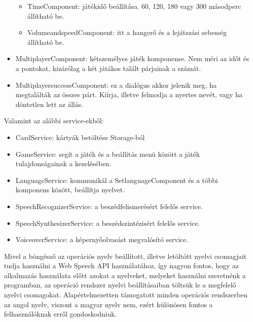 \documentclass[12pt]{report}
\begin{document}
\begin{itemize}
\begin{itemize}
        \item TimeComponent: játékidő beállítása. 60, 120, 180 vagy 300 másodperc állítható be.
        \item VolumeandspeedComponent: itt a hangerő és a lejátszási sebesség állítható be.
    \end{itemize}
    \item MultiplayerComponent: kétszemélyes játék komponense. Nem méri az időt és a pontokat, kizárólag a két játákos talált párjainak a számát.
    \item MultiplayersuccessComponent: ez a dialógus akkor jelenik meg, ha megtalálták az összes párt. Kiírja, illetve felmodja a nyertes nevét, vagy ha döntetlen lett az állás.
\end{itemize}

Valamint az alábbi service-ekből:
\begin{itemize}
    \item CardService: kártyák betöltése Storage-ból
    \item GameService: segít a játék és a beállítás menü között a játék tulajdonságainak a kezelésében.
    \item LanguageService: kommunikál a SetlanguageComponent és a többi komponens között, beállítja nyelvet.
    \item SpeechRecognizerService: a beszédfelismerésért felelős service.
    \item SpeechSynthesizerService: a beszédszintézisért felelős service.
    \item VoiceoverService: a képernyőolvasást megvalósító service.
\end{itemize}
\pagebreak
Mivel a böngésző az operációs nyelv beállított, illetve letöltött nyelvi csomagjait tudja használni a Web Speech API használatához, így nagyon fontos, hogy az alkalmazás használata előtt azokat a nyelveket, melyeket használni szeretnénk a programban, az operáció rendszer nyelvi beállításaiban töltsük le a megfelelő nyelvi csomagokat. Alapértelmezetten támogatott minden operációs rendszerben az angol nyelv, viszont a magyar nyelv nem, ezért különösen fontos a felhasználóknak erről gondoskodniuk.
\end{document}
